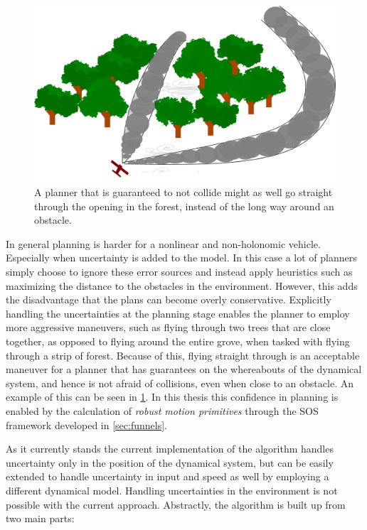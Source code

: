 \begin{figure}
  \centering
  \includegraphics[width=.8\textwidth]{figures/experiments/aggressive-maneuver}
  \caption[Advantages of explicitly reasoning about uncertainty]{A planner that
    is guaranteed to not collide might as well go straight through the opening
    in the forest, instead of the long way around an obstacle.}
  \label{fig:aggressive-maneuver}
\end{figure}

In general planning is harder for a nonlinear and non-holonomic vehicle.
Especially when uncertainty is added to the model. In this case a lot of
planners simply choose to ignore these error sources and instead apply
heuristics such as maximizing the distance to the obstacles in the environment.
However, this adds the disadvantage that the plans can become overly
conservative. Explicitly handling the uncertainties at the planning stage
enables the planner to employ more aggressive maneuvers, such as flying through
two trees that are close together, as opposed to flying around the entire grove,
when tasked with flying through a strip of forest. Because of this, flying
straight through is an acceptable maneuver for a planner that has guarantees on
the whereabouts of the dynamical system, and hence is not afraid of collisions,
even when close to an obstacle. An example of this can be seen in
\cref{fig:aggressive-maneuver}. In this thesis this confidence in planning is
enabled by the calculation of \textit{robust motion primitives} through the
\ac{SOS} framework developed in \cref{sec:funnels}.

As it currently stands the current implementation of the \rrtfunnel{} algorithm
handles uncertainty only in the position of the dynamical system, but can be
easily extended to handle uncertainty in input and speed as well by employing a
different dynamical model. Handling uncertainties in the environment is not
possible with the current approach. Abstractly, the algorithm is built up from
two main parts:

